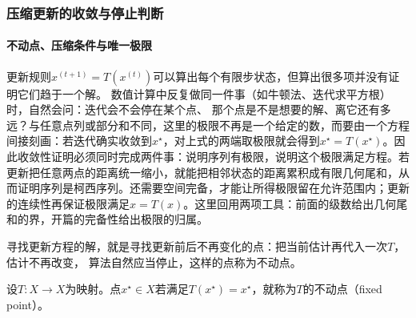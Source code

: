 \subsubsection{压缩更新的收敛与停止判断}
\label{sec:analysis-complete-contraction}

\paragraph{不动点、压缩条件与唯一极限}

更新规则$x^{(t+1)}=T(x^{(t)})$可以算出每个有限步状态，但算出很多项并没有证明它们趋于一个解。
数值计算中反复做同一件事（如牛顿法、迭代求平方根）时，自然会问：迭代会不会停在某个点、
那个点是不是想要的解、离它还有多远？与任意点列或部分和不同，这里的极限不再是一个给定的数，而要由一个方程间接刻画：若迭代确实收敛到$x^\star$，对上式的两端取极限就会得到$x^\star=T(x^\star)$。因此收敛性证明必须同时完成两件事：说明序列有极限，说明这个极限满足方程。若更新把任意两点的距离统一缩小，就能把相邻状态的距离累积成有限几何尾和，从而证明序列是柯西序列。还需要空间完备，才能让所得极限留在允许范围内；更新的连续性再保证极限满足$x=T(x)$。这里回用两项工具：前面的级数给出几何尾和的界，开篇的完备性给出极限的归属。


寻找更新方程的解，就是寻找更新前后不再变化的点：把当前估计再代入一次$T$，估计不再改变，
算法自然应当停止，这样的点称为不动点。
\begin{definition}[不动点]
\label{def:analysis-fixed-point}
设$T:X\to X$为映射。点$x^\star\in X$若满足$T(x^\star)=x^\star$，就称为$T$的不动点（fixed point）。
\end{definition}

